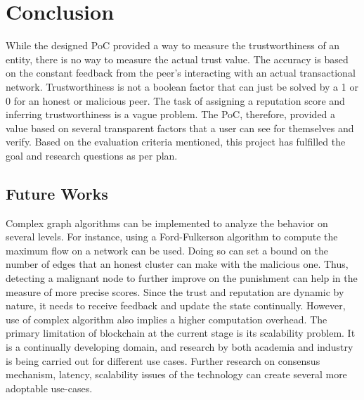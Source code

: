 \chapter{Conclusion} \label{ch:conclusion}
While the designed PoC provided a way to measure the trustworthiness of an
entity, there is no way to measure the actual trust value. The accuracy is
based on the constant feedback from the peer's interacting with an actual
transactional network. Trustworthiness is not a boolean factor that can just be
solved by a 1 or 0 for an honest or malicious peer. The task of assigning a
reputation score and inferring trustworthiness is a vague problem. The PoC,
therefore, provided a value based on several transparent factors that a user
can see for themselves and verify. Based on the evaluation criteria mentioned,
this project has fulfilled the goal and research questions as per plan. 

\section{Future Works}
Complex graph algorithms can be implemented to analyze the behavior on several
levels. For instance, using a Ford-Fulkerson algorithm to compute the maximum
flow on a network can be used. Doing so can set a bound on the number of edges
that an honest cluster can make with the malicious one. Thus, detecting a
malignant node to further improve on the punishment can help in the measure of
more precise scores. Since the trust and reputation are dynamic by nature, it
needs to receive feedback and update the state continually. However, use of
complex algorithm also implies a higher computation overhead. The primary
limitation of blockchain at the current stage is its scalability problem. It is
a continually developing domain, and research by both academia and industry is
being carried out for different use cases. Further research on consensus
mechanism, latency, scalability issues of the technology can create several
more adoptable use-cases. 




%
